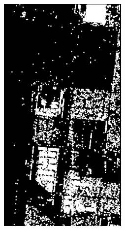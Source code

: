 \begin{figure}[t]
\begin{subfigure}[b]{0.18\columnwidth}
		\includegraphics[width=\textwidth]{Figures/CD/ADD/d}
		\caption{}
\end{subfigure}
\hspace{0.01pt}
\begin{subfigure}[b]{0.18\columnwidth}

\end{subfigure}
\end{figure}
